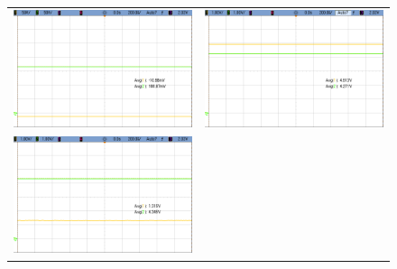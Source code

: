 \begin{figure}[H]
    \centering
        \begin{tabular}{c c}
            \includegraphics[scale=0.2]{../EJ5/Mediciones/Osciloscopio/TTL_AND_SOLA/cropped_entrada_estado_bajo.png} & 
            \includegraphics[scale=0.2]{../EJ5/Mediciones/Osciloscopio/TTL_AND_SOLA/cropped_entrada_estado_alto.png} \\ 
            \includegraphics[scale=0.2]{../EJ5/Mediciones/Osciloscopio/TTL_AND_SOLA/cropped_entrada_al_aire.png} & 

\end{tabular}
\end{figure}
